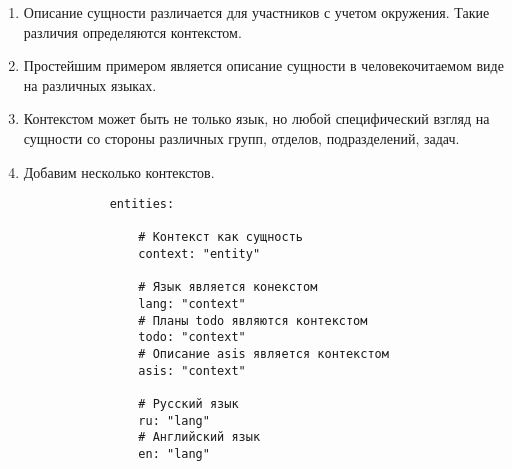 \documentclass[final]{article}
\begin{document}
        \begin{enumerate} 

            \item Описание сущности различается для участников с 
            учетом окружения. Такие различия определяются контекстом.

            \item Простейшим примером является описание сущности в 
            человекочитаемом виде на различных языках.

            \item Контекстом может быть не только язык, но любой специфический 
            взгляд на сущности со стороны различных групп, отделов, 
            подразделений, задач.

            \item Добавим несколько контекстов.

            \begin{verbatim}
            entities:

                # Контекст как сущность
                context: "entity"

                # Язык является конекстом
                lang: "context"
                # Планы todo являются контекстом
                todo: "context"
                # Описание asis является контекстом
                asis: "context"

                # Русский язык
                ru: "lang"
                # Английский язык
                en: "lang"

            \end{verbatim}

        \end{enumerate}
\end{document}
